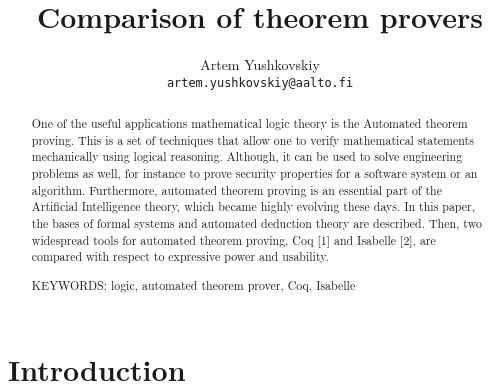 \documentclass[article]{aaltoseries}
\begin{document}
 

\title{Comparison of theorem provers}

\author{Artem Yushkovskiy
\\\textnormal{\texttt{artem.yushkovskiy@aalto.fi}}}


\maketitle


\begin{abstract}
One of the useful applications mathematical logic theory is the Automated theorem proving. This is a set of techniques that allow one to verify mathematical statements mechanically using logical reasoning. Although, it can be used to solve engineering problems as well, for instance to prove security properties for a software system or an algorithm. Furthermore, automated theorem proving is an essential part of the Artificial Intelligence theory, which became highly evolving these days. In this paper, the bases of formal systems and automated deduction theory are described. Then, two widespread tools for automated theorem proving, Coq [1] and Isabelle [2], are compared with respect to expressive power and usability.

\vspace{3mm}
\noindent KEYWORDS: logic, automated theorem prover, Coq, Isabelle

\end{abstract}




\section{Introduction}
\end{document}
